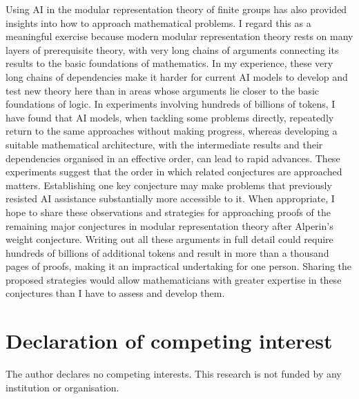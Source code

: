 \documentclass[10pt]{amsart}
\theoremstyle{definition}
\numberwithin{equation}{section}
\numberwithin{table}{section}
\begin{document}
Using AI in the modular representation theory of finite groups has also
provided insights into how to approach mathematical problems.
I regard this as a meaningful exercise because modern modular
representation theory rests on many layers of prerequisite theory,
with very long chains of arguments connecting its results to the basic
foundations of mathematics. In my experience, these very long chains of dependencies
make it harder for current AI models to develop and test new theory here
than in areas whose arguments lie closer to the basic foundations of
logic. In experiments involving hundreds of billions of tokens, I have found that AI
models, when tackling some problems directly, repeatedly return to the same
approaches without making progress, whereas
developing a suitable mathematical architecture, with the intermediate
results and their dependencies organised in an effective order, can lead
to rapid advances. These experiments suggest that the order in which
related conjectures are approached matters. Establishing one key
conjecture may make problems that previously resisted AI assistance
substantially more accessible to it. When appropriate, I hope to share
these observations and strategies for approaching proofs of the remaining
major conjectures in modular representation theory after Alperin's weight
conjecture. Writing out all these
arguments in full detail could require hundreds of billions of additional
tokens and result in more than a thousand pages of proofs, making it an
impractical undertaking for one person. Sharing the proposed strategies would allow mathematicians with greater
expertise in these conjectures than I have to assess and develop them.

\section*{Declaration of competing interest}

The author declares no competing interests. This research is not funded
by any institution or organisation.
\end{document}
